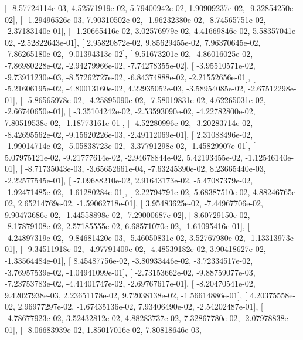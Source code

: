 \documentclass{article}
\begin{document}
       [ -8.57724114e-03,   4.52571919e-02,   5.79400942e-02,
          1.90909237e-02,  -9.32854250e-02],
       [ -1.29496526e-03,   7.90310502e-02,  -1.96232380e-02,
         -8.74565751e-02,  -2.37183140e-01],
       [ -1.20665416e-02,   3.02576979e-02,   4.41669846e-02,
          5.58357041e-02,  -2.52822643e-01],
       [  2.95820872e-02,   9.85629455e-02,   7.96370645e-02,
         -7.86265180e-02,  -9.01394313e-02],
       [  9.51673201e-02,  -4.86016025e-02,  -7.86980228e-02,
         -2.94279966e-02,  -7.74278355e-02],
       [ -3.95510571e-02,  -9.73911230e-03,  -8.57262727e-02,
         -6.84374888e-02,  -2.21552656e-01],
       [ -5.21606195e-02,  -4.80013160e-02,   4.22935052e-03,
         -3.58954085e-02,  -2.67512298e-01],
       [ -5.86565978e-02,  -4.25895090e-02,  -7.58019831e-02,
          4.62265031e-02,  -2.66740650e-01],
       [ -3.35104242e-02,  -2.53593090e-02,  -4.22782800e-02,
          7.80519538e-02,  -1.18773161e-01],
       [ -4.52280996e-02,  -3.20283714e-02,  -8.42695562e-02,
         -9.15620226e-03,  -2.49112069e-01],
       [  2.31088496e-02,  -1.99014714e-02,  -5.05838723e-02,
         -3.37791298e-02,  -1.45829907e-01],
       [  5.07975121e-02,  -9.21777614e-02,  -2.94678844e-02,
          5.42193455e-02,  -1.12546140e-01],
       [ -8.71735043e-03,  -3.65652661e-04,  -7.63245390e-02,
          8.23665440e-03,  -2.22577545e-01],
       [ -7.09688210e-02,   2.91643173e-02,  -5.47087379e-02,
         -1.92471485e-02,  -1.61280284e-01],
       [  2.22794791e-02,   5.68387510e-02,   4.88246765e-02,
          2.65214769e-02,  -1.59062718e-01],
       [  3.95483625e-02,  -7.44967706e-02,   9.90473686e-02,
         -1.44558898e-02,  -7.29000687e-02],
       [  8.60729150e-02,  -8.17879108e-02,   2.57185555e-02,
          6.68571070e-02,  -1.61095416e-01],
       [ -4.24897319e-02,  -9.84681420e-03,  -5.46050831e-02,
          3.52767980e-02,  -1.13313973e-01],
       [ -9.34511918e-02,  -4.97791409e-02,  -4.48539182e-02,
          3.90418627e-02,  -1.33564484e-01],
       [  8.45487756e-02,  -3.80933446e-02,  -3.72334517e-02,
         -3.76957539e-02,  -1.04941099e-01],
       [ -2.73153662e-02,  -9.88759077e-03,  -7.23753783e-02,
         -4.41401747e-02,  -2.69767617e-01],
       [ -8.20470541e-02,   9.42027938e-03,   2.23651178e-02,
          9.72038138e-02,  -1.56614886e-01],
       [  4.20375558e-02,   2.96977297e-02,  -1.67435136e-02,
          7.93406490e-02,  -2.54202487e-01],
       [ -4.78677923e-02,   3.52432812e-02,   4.88283737e-02,
          7.32867780e-02,  -2.07978838e-01],
       [ -8.06683939e-02,   1.85017016e-02,   7.80818646e-03,
\end{document}
